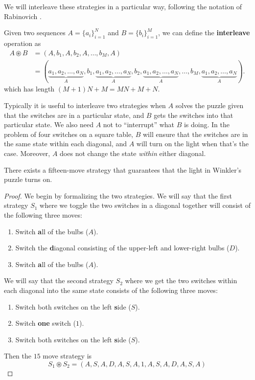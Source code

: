 We will interleave these strategies in a particular way, following the notation
of Rabinovich \cite{Rabinovich2022}.

\begin{definition}
  Given two sequences $A = \{a_i\}_{i=1}^N$ and $B = \{b_i\}_{i=1}^M$, we can
  define the \textbf{interleave} operation as \begin{align}
    A \circledast B &= (A,b_1,A,b_2,A,\dots,b_M,A) \\
      &= (
      \underbrace{a_1, a_2, \dots, a_N}_A,
      b_1,
      \underbrace{a_1, a_2, \dots, a_N}_A,
      b_2,
      \underbrace{a_1, a_2, \dots, a_N}_A,
      \dots,
      b_M,
      \underbrace{a_1, a_2, \dots, a_N}_A).
  \end{align} which has length $(M+1)N + M = MN + M + N$.
\end{definition}

Typically it is useful to interleave two strategies when
$A$ solves the puzzle given that the switches are in a particular state, and
$B$ gets the switches into that particular state.
We also need $A$ not to ``interrupt'' what $B$ is doing.
In the problem of four switches on a square table,
$B$ will ensure that the switches are in the same state within each diagonal,
and $A$ will turn on the light when that's the case.
Moreover, $A$ does not change the state \textit{within} either diagonal.

\begin{proposition}
  There exists a fifteen-move strategy that guarantees that the light in
  Winkler's puzzle turns on.
  \label{prop:WinklersSolution}
\end{proposition}
\begin{proof}
  We begin by formalizing the two strategies. We will say that the first
  strategy $S_1$ where we toggle the two switches in a diagonal together
  will consist of the following three moves: \begin{enumerate}
    \item Switch \textbf{a}ll of the bulbs ($A$).
    \item Switch the \textbf{d}iagonal consisting of the upper-left and lower-right bulbs ($D$).
    \item Switch \textbf{a}ll of the bulbs ($A$).
  \end{enumerate}
  We will say that the second strategy $S_2$ where we get the two switches
  within each diagonal into the same state consists of the following three
  moves: \begin{enumerate}
    \item Switch both switches on the left \textbf{s}ide ($S$).
    \item Switch \textbf{one} switch ($1$).
    \item Switch both switches on the left \textbf{s}ide ($S$).
  \end{enumerate}
  Then the $15$ move strategy is \begin{equation}
    S_1 \circledast S_2 = (A, S, A, D, A, S, A, 1, A, S, A, D, A, S, A)
  \end{equation}
\end{proof}


